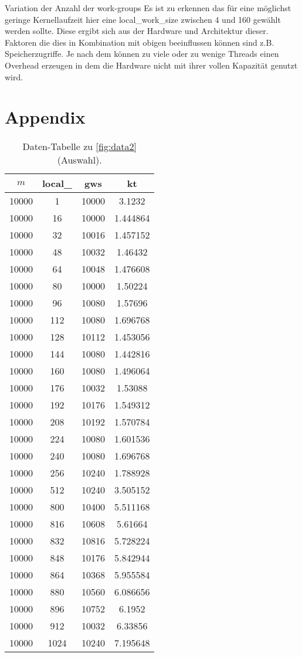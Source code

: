 \documentclass[
ngerman,
subtask=ruled %
]{tudaexercise}
\begin{document}
\begin{task} {Variation der Anzahl der work-groups}
		Es ist zu erkennen das für eine möglichst geringe Kernellaufzeit hier eine local\_work\_size zwischen 4 und 160 gewählt werden sollte.
		Diese ergibt sich aus der Hardware und Architektur dieser. 
		Faktoren die dies in Kombination mit obigen beeinflussen können sind z.B. Speicherzugriffe.
		Je nach dem können zu viele oder zu wenige Threads einen Overhead erzeugen in dem die Hardware nicht mit ihrer vollen Kapazität genutzt wird.
	\end{task}


	\appendix
	\section{Appendix}
	\begin{table}[H]
		\centering
		\begin{tabular}{|c|c|c|c|}
			\hline
			$m$ & local\_ & \textbf{gws} & \textbf{kt} \\
			\hline
			10000 & 1 & 10000 & 3.1232 \\
			10000 & 16 & 10000 & 1.444864 \\
			10000 & 32 & 10016 & 1.457152 \\
			10000 & 48 & 10032 & 1.46432 \\
			10000 & 64 & 10048 & 1.476608 \\
			10000 & 80 & 10000 & 1.50224 \\
			10000 & 96 & 10080 & 1.57696 \\
			10000 & 112 & 10080 & 1.696768 \\
			10000 & 128 & 10112 & 1.453056 \\
			10000 & 144 & 10080 & 1.442816 \\
			10000 & 160 & 10080 & 1.496064 \\
			10000 & 176 & 10032 & 1.53088 \\
			10000 & 192 & 10176 & 1.549312 \\
			10000 & 208 & 10192 & 1.570784 \\
			10000 & 224 & 10080 & 1.601536 \\
			10000 & 240 & 10080 & 1.696768 \\
			10000 & 256 & 10240 & 1.788928 \\
			10000 & 512 & 10240 & 3.505152 \\
			10000 & 800 & 10400 & 5.511168 \\
			10000 & 816 & 10608 & 5.61664 \\
			10000 & 832 & 10816 & 5.728224 \\
			10000 & 848 & 10176 & 5.842944 \\
			10000 & 864 & 10368 & 5.955584 \\
			10000 & 880 & 10560 & 6.086656 \\
			10000 & 896 & 10752 & 6.1952 \\
			10000 & 912 & 10032 & 6.33856 \\
			10000 & 1024 & 10240 & 7.195648 \\
			\hline
		\end{tabular}
		\caption{Daten-Tabelle zu \ref{fig:data2} (Auswahl).}
		\label{tab:data2}
	\end{table}

	
	
\end{document}
